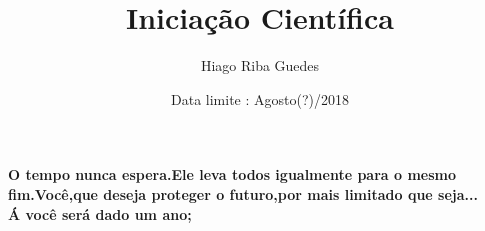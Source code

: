 \documentclass[11pt,a4paper]{article}
\title{Iniciação Científica}
\author{Hiago Riba Guedes}
\date{Data limite : Agosto(?)/2018}
\begin{document}
\maketitle
\textbf{O tempo nunca espera.Ele leva todos igualmente para o mesmo fim.Você,que deseja proteger o futuro,por mais limitado que seja...\\ Á você será dado um ano;  }\\\\
\end{document}
